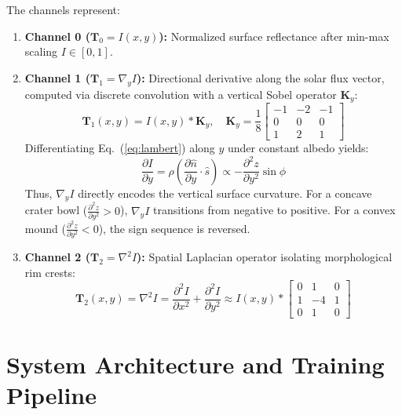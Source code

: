 \documentclass[10pt,journal,compsoc]{IEEEtran}
\theoremstyle{definition}
\begin{document}
\noindent The channels represent:
\begin{enumerate}
    \item \textbf{Channel 0 ($\mathbf{T}_0 = I(x,y)$):} Normalized surface reflectance after min-max scaling $I \in [0, 1]$.
    \item \textbf{Channel 1 ($\mathbf{T}_1 = \nabla_y I$):} Directional derivative along the solar flux vector, computed via discrete convolution with a vertical Sobel operator $\mathbf{K}_y$:
    \begin{equation}
    \mathbf{T}_1(x,y) = I(x,y) * \mathbf{K}_y, \quad \mathbf{K}_y = \frac{1}{8} \begin{bmatrix} -1 & -2 & -1 \\ 0 & 0 & 0 \\ 1 & 2 & 1 \end{bmatrix}
    \end{equation}
    Differentiating Eq.~(\ref{eq:lambert}) along $y$ under constant albedo yields:
    \begin{equation}
    \frac{\partial I}{\partial y} = \rho \left( \frac{\partial \hat{n}}{\partial y} \cdot \hat{s} \right) \propto -\frac{\partial^2 z}{\partial y^2} \sin\phi
    \end{equation}
    Thus, $\nabla_y I$ directly encodes the vertical surface curvature. For a concave crater bowl ($\frac{\partial^2 z}{\partial y^2} > 0$), $\nabla_y I$ transitions from negative to positive. For a convex mound ($\frac{\partial^2 z}{\partial y^2} < 0$), the sign sequence is reversed.
    \item \textbf{Channel 2 ($\mathbf{T}_2 = \nabla^2 I$):} Spatial Laplacian operator isolating morphological rim crests:
    \begin{equation}
    \mathbf{T}_2(x,y) = \nabla^2 I = \frac{\partial^2 I}{\partial x^2} + \frac{\partial^2 I}{\partial y^2} \approx I(x,y) * \begin{bmatrix} 0 & 1 & 0 \\ 1 & -4 & 1 \\ 0 & 1 & 0 \end{bmatrix}
    \end{equation}
\end{enumerate}

\section{System Architecture and Training Pipeline}
\end{document}
